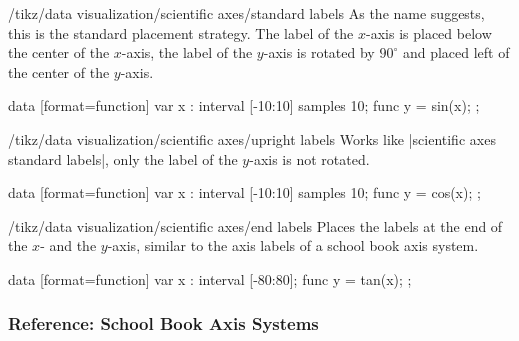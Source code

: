 \begin{key}{/tikz/data visualization/scientific axes/standard labels}
  As the name suggests, this is the standard placement strategy. The
  label of the $x$-axis is placed below the center of the $x$-axis,
  the label of the $y$-axis is rotated by $90^\circ$ and placed left
  of the center of the $y$-axis.
\begin{codeexample}[width=8cm]
\tikz \datavisualization
 [scientific axes={clean, standard labels},
  visualize as smooth line,
  x axis={label=degree $d$,
    ticks={tick unit={}^\circ}},
  y axis={label=$\sin d$}]
data [format=function] {
  var x : interval [-10:10] samples 10;
  func y = sin(\value x);
};
\end{codeexample}
\end{key}

\begin{key}{/tikz/data visualization/scientific axes/upright labels}
  Works like |scientific axes standard labels|, only the label of the
  $y$-axis is not rotated.
\begin{codeexample}[width=8cm]
\tikz \datavisualization [
  scientific axes={clean, upright labels},
  visualize as smooth line,
  x axis={label=degree $d$,
    ticks={tick unit={}^\circ}},
  y axis={label=$\cos d$, include value=1,
    ticks={style={
        /pgf/number format/precision=4,
        /pgf/number format/fixed zerofill}}}]
data [format=function] {
  var x : interval [-10:10] samples 10;
  func y = cos(\value x);
};
\end{codeexample}
\end{key}


\begin{key}{/tikz/data visualization/scientific axes/end labels}
  Places the labels at the end of the $x$- and the $y$-axis, similar
  to the axis labels of a school book axis system.
\begin{codeexample}[width=8cm]
\tikz \datavisualization [
  scientific axes={clean, end labels},
  visualize as smooth line,
  x axis={label=degree $d$,
    ticks={tick unit={}^\circ}},
  y axis={label=$\tan d$}]
data [format=function] {
  var x : interval [-80:80];
  func y = tan(\value x);
};
\end{codeexample}
\end{key}



\subsubsection{Reference: School Book Axis Systems}

